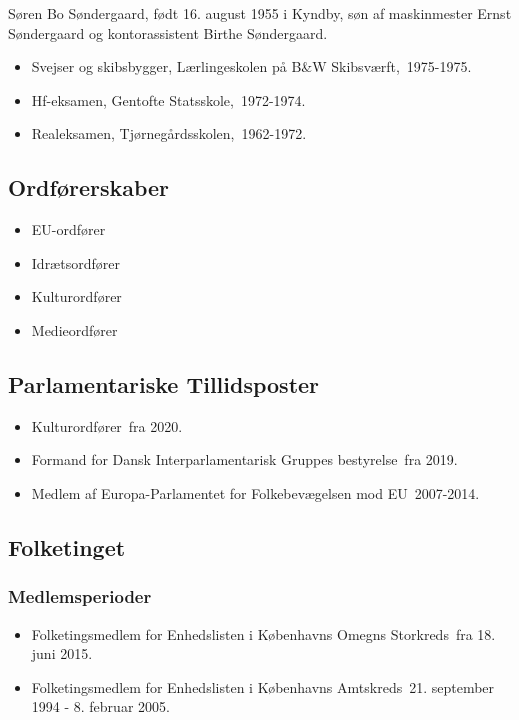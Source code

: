 \documentclass[11pt, a4paper]{awesome-cv}
\begin{document}
\makecvheader[R]
\makelettertitle
\begin{cvletter}
Søren Bo Søndergaard, født 16. august 1955 i Kyndby, søn af maskinmester Ernst Søndergaard og kontorassistent Birthe Søndergaard.

\begin{itemize}
\item Svejser og skibsbygger, Lærlingeskolen på B&W Skibsværft, 1975-1975.
\item Hf-eksamen, Gentofte Statsskole, 1972-1974.
\item Realeksamen, Tjørnegårdsskolen, 1962-1972.
\end{itemize}
\subsection*{Ordførerskaber}
\begin{itemize}
\item EU-ordfører
\item Idrætsordfører
\item Kulturordfører
\item Medieordfører
\end{itemize}
\subsection*{Parlamentariske Tillidsposter}
\begin{itemize}
\item Kulturordfører fra 2020.
\item Formand for Dansk Interparlamentarisk Gruppes bestyrelse fra 2019.
\item Medlem af Europa-Parlamentet for Folkebevægelsen mod EU 2007-2014.
\end{itemize}
\subsection*{Folketinget}
\subsubsection*{Medlemsperioder}
\begin{itemize}
\item Folketingsmedlem for Enhedslisten i Københavns Omegns Storkreds fra 18. juni 2015.
\item Folketingsmedlem for Enhedslisten i Københavns Amtskreds 21. september 1994 - 8. februar 2005.
\end{itemize}

\end{cvletter}
\end{document}
